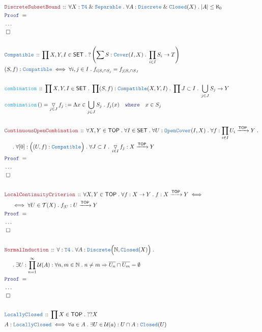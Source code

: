 \documentclass[12pt]{scrartcl}
\newcommand{\TYPE}[1]{\textcolor{NavyBlue}{\mathtt{#1}}}
\newcommand{\FUNC}[1]{\textcolor{Cerulean}{\mathtt{#1}}}
\newcommand{\LOGIC}[1]{\textcolor{Blue}{\mathtt{#1}}}
\newcommand{\THM}[1]{\textcolor{Maroon}{\mathtt{#1}}}
\renewcommand{\.}{\; . \;}
\newcommand{\de}{: \kern 0.1pc =}
\newcommand{\where}{\LOGIC{where}}
\newcommand{\Act}[1]{\left( #1 \right)}
\newcommand{\Theorem}[2]{& \THM{#1} \, :: \, #2 \\ & \Proof = \\ }
\newcommand{\DeclareType}[2]{& \TYPE{#1} \, :: \, #2 \\}
\newcommand{\DefineType}[3]{& #1 : \TYPE{#2} \iff #3 \\}
\newcommand{\DeclareFunc}[2]{& \FUNC{#1} \, :: \, #2 \\}
\newcommand{\DefineNamedFunc}[4]{&  \FUNC{#1}\Act{#2} = #3 \de #4 \\}
\newcommand{\NewLine}{\\ & \kern 1pc}
\newcommand{\Page}[1]{ \begin{align*} #1 \end{align*}   }
\newcommand{\NoProof}{ & \ldots \\ \EndProof}
\renewcommand{\And}{\; \& \;}
\newcommand{\Imply}{\Rightarrow}
\newcommand{\Nat}{\mathbb{N} }
\newcommand{\Arrow}{\xrightarrow}
\newcommand{\QED}{\; \square}
\newcommand{\EndProof}{& \QED \\}
\newcommand{\Proof}{\LOGIC{Proof} \; }
\newcommand{\SET}{\mathsf{SET}}
\DeclareMathOperator{\combo}{\triangledown}
\newcommand{\TOP}{\mathsf{TOP}}
\newcommand{\T}{\mathcal{T}}
\newcommand{\U}{\mathcal{U}}
\begin{document}
\Page{
	\Theorem{DiscreteSubsetBound}
	{
		\forall X : \TYPE{T4} \And \TYPE{Separable} \.
		\forall A : \TYPE{Discrete} \And \TYPE{Closed}(X) \. 
		|A| \le \aleph_0
	}
	\NoProof
	\\
	\DeclareType{Compatible}{ \prod X,Y,I \in \SET \. ?\left( \sum S : \TYPE{Cover}(I,X) \. \prod_{i \in I} S_i \to T\right) }
	\DefineType{(S,f)}{Compatible}{\forall i,j \in I \. f_{i|S_i \cap S_j} = f_{j|S_i \cap S_J}}
	\\
	\DeclareFunc{combination}{
		\prod X,Y,I \in \SET \. 
		\prod (S,f) : \TYPE{Compatible}(X,Y,I) \. 
		\prod J \subset I \. \bigcup_{j \in J} S_j \to Y 
	}
	\DefineNamedFunc{combination}{}{\combo_{j \in J} f_j}{\Lambda x \in \bigcup_{j \in J} S_j \. f_j(x) 
		\quad  \where \quad x \in S_j} 
	\\
	\Theorem{ContinuousOpenCombination}
	{
		\forall X,Y \in \TOP \. \forall I \in \SET \.
		\forall U : \TYPE{OpenCover}(I,X) \. 
		\forall f : \prod_{i \in I}  U_i \Arrow{\TOP} Y \. \NewLine \. 
		\forall [0] : \Big( (U,f) : \TYPE{Compatible}  \Big) \.
		\forall J \subset I \. 
		\combo_{i \in I} f_j : X \Arrow{\TOP} Y
	}
	\NoProof
	\\
	\Theorem{LocalContinuityCriterion}
	{
		\forall X,Y \in \TOP \.
		\forall f : X \to Y \.
		f : X \Arrow{\TOP} Y 
		\iff \NewLine \iff 
		\forall U \in \T(X) \.
		f_{|U} : U \Arrow{\TOP} Y
	}
	\NoProof
	\\
	\Theorem{NormalInduction}
	{
		\forall : \TYPE{T4} \.
		\forall A : \TYPE{Discrete}\Big(\Nat, \TYPE{Closed}(X) \Big) \. \NewLine \.
		\exists U :\prod^\infty_{n = 1} \U(A) :
		\forall n,m \in \Nat \. n \neq m \Imply \overline{U_n} \cap \overline{U_m} = \emptyset
	}
	\NoProof
	\\
	\DeclareType{LocallyClosed}{ \prod X \in \TOP \. ??X}
	\DefineType{A}{LocallyClosed}{\forall a \in A \. \exists U \in \U(a) : U \cap A : \TYPE{Closed}(U) }
}
\end{document}
